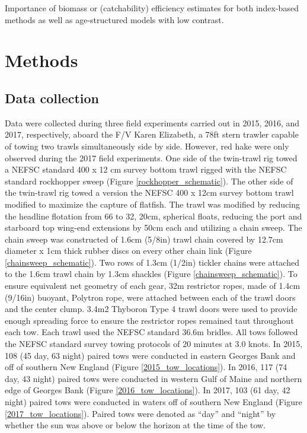 \documentclass[]{article}
\begin{document}
Importance of biomass or (catchability) efficiency estimates for both
index-based methods as well as age-structured models with low contrast.

\hypertarget{methods}{%
\section{Methods}\label{methods}}

\hypertarget{data-collection}{%
\subsection{Data collection}\label{data-collection}}

Data were collected during three field experiments carried out in 2015,
2016, and 2017, respectively, aboard the F/V Karen Elizabeth, a 78ft
stern trawler capable of towing two trawls simultaneously side by side.
However, red hake were only observed during the 2017 field experiments.
One side of the twin-trawl rig towed a NEFSC standard 400 x 12 cm survey
bottom trawl rigged with the NEFSC standard rockhopper sweep
\citep{politisetal14} (Figure \ref{rockhopper_schematic}). The other
side of the twin-trawl rig towed a version the NEFSC 400 x 12cm survey
bottom trawl modified to maximize the capture of flatfish. The trawl was
modified by reducing the headline flotation from 66 to 32, 20cm,
spherical floats, reducing the port and starboard top wing-end
extensions by 50cm each and utilizing a chain sweep. The chain sweep was
constructed of 1.6cm (5/8in) trawl chain covered by 12.7cm diameter x
1cm thick rubber discs on every other chain link (Figure
\ref{chainsweep_schematic}). Two rows of 1.3cm (1/2in) tickler chains
were attached to the 1.6cm trawl chain by 1.3cm shackles (Figure
\ref{chainsweep_schematic}). To ensure equivalent net geometry of each
gear, 32m restrictor ropes, made of 1.4cm (9/16in) buoyant, Polytron
rope, were attached between each of the trawl doors and the center
clump. 3.4m2 Thyboron Type 4 trawl doors were used to provide enough
spreading force to ensure the restrictor ropes remained taut throughout
each tow. Each trawl used the NEFSC standard 36.6m bridles. All tows
followed the NEFSC standard survey towing protocols of 20 minutes at 3.0
knots. In 2015, 108 (45 day, 63 night) paired tows were conducted in
eastern Georges Bank and off of southern New England (Figure
\ref{2015_tow_locations}). In 2016, 117 (74 day, 43 night) paired tows
were conducted in western Gulf of Maine and northern edge of Georges
Bank (Figure \ref{2016_tow_locations}). In 2017, 103 (61 day, 42 night)
paired tows were conducted in waters off of southern New England (Figure
\ref{2017_tow_locations}). Paired tows were denoted as ``day'' and
``night'' by whether the sun was above or below the horizon at the time
of the tow.
\end{document}
